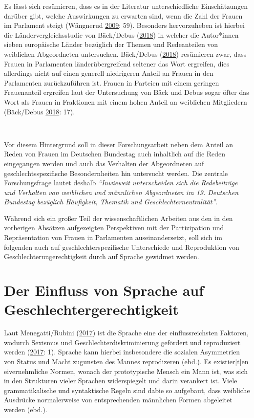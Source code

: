 \documentclass[12pt,ngerman,]{article}
\begin{document}
Es lässt sich resümieren, dass es in der Literatur unterschiedliche
Einschätzungen darüber gibt, welche Auswirkungen zu erwarten sind, wenn
die Zahl der Frauen im Parlament steigt (Wängnerud
\protect\hyperlink{ref-wangnerud_2009}{2009}: 59). Besonders
hervorzuheben ist hierbei die Ländervergleichsstudie von Bäck/Debus
(\protect\hyperlink{ref-back_2018}{2018}) in welcher die Autor*innen
sieben europäische Länder bezüglich der Themen und Redeanteilen von
weiblichen Abgeordneten untersuchen. Bäck/Debus
(\protect\hyperlink{ref-back_2018}{2018}) resümieren zwar, dass Frauen
in Parlamenten länderübergreifend seltener das Wort ergreifen, dies
allerdings nicht auf einen generell niedrigeren Anteil an Frauen in den
Parlamenten zurückzuführen ist. Frauen in Parteien mit einem geringen
Frauenanteil ergreifen laut der Untersuchung von Bäck und Debus sogar
öfter das Wort als Frauen in Fraktionen mit einem hohen Anteil an
weiblichen Mitgliedern (Bäck/Debus
\protect\hyperlink{ref-back_2018}{2018}: 17).

~

Vor diesem Hintergrund soll in dieser Forschungsarbeit neben dem Anteil
an Reden von Frauen im Deutschen Bundestag auch inhaltlich auf die Reden
eingegangen werden und auch das Verhalten der Abgeordneten auf
geschlechtsspezifische Besondernheiten hin untersucht werden. Die
zentrale Forschungsfrage lautet deshalb \emph{\enquote{Inwieweit
unterscheiden sich die Redebeiträge und Verhalten von weiblichen und
männlichen Abgeordneten im 19. Deutschen Bundestag bezüglich Häufigkeit,
Thematik und Geschlechterneutralität}}.

Während sich ein großer Teil der wissenschaftlichen Arbeiten aus den in
den vorherigen Absätzen aufgezeigten Perspektiven mit der Partizipation
und Repräsentation von Frauen in Parlamenten auseinandersetzt, soll sich
im folgenden auch auf geschlechterspezifische Unterschiede und
Reproduktion von Geschlechterungerechtigkeit durch auf Sprache gewidmet
werden.

\hypertarget{der-einfluss-von-sprache-auf-geschlechtergerechtigkeit}{%
\section{Der Einfluss von Sprache auf
Geschlechtergerechtigkeit}\label{der-einfluss-von-sprache-auf-geschlechtergerechtigkeit}}

Laut Menegatti/Rubini (\protect\hyperlink{ref-menegatti_2017}{2017}) ist
die Sprache eine der einflussreichsten Faktoren, wodurch Sexismus und
Geschlechterdiskriminierung gefördert und reproduziert werden
(\protect\hyperlink{ref-menegatti_2017}{2017}: 1). Sprache kann hierbei
insbesondere die sozialen Asymmetrien von Status und Macht zugunsten des
Mannes reprodizeren (ebd.). Es existier{[}t{]}en eivernehmliche Normen,
wonach der prototypische Mensch ein Mann ist, was sich in den Strukturen
vieler Sprachen widerspiegelt und darin verankert ist. Viele
grammatikalische und syntaktische Regeln sind dabie so aufgebaut, dass
weibliche Ausdrücke normalerweise von entsprechenden männlichen Formen
abgeleitet werden (ebd.).
\end{document}
